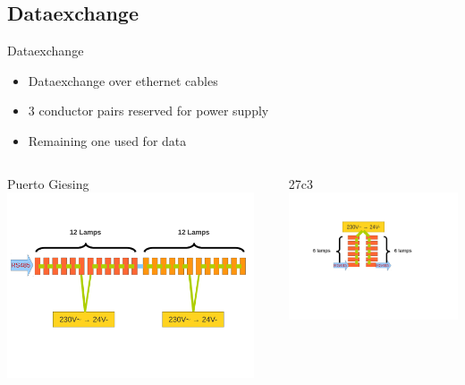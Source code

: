 \documentclass{beamer}
\begin{document}
\subsection{Dataexchange}
  \begin{frame}{Dataexchange}
    \begin{itemize}
      \item Dataexchange over ethernet cables 
      \item 3 conductor pairs reserved for power supply 
      \item Remaining one used for data
    \end{itemize}
    \begin{columns}[T]
      \begin{column}{7cm}
        \hskip 2.6cm
        Puerto Giesing
        \vskip 0.2cm
        \includegraphics[width=7.3cm, clip, trim= 0cm 4.6cm 0.5cm 4cm]{bilder/12lampen_rs485.pdf}
      \end{column}
      \begin{column}{5cm}
        \hskip 2.0cm
        27c3
        \vskip 0.7cm
         \includegraphics[width=5.5cm, clip, trim= 2.5cm 8cm 3.5cm 4cm]{bilder/6lampen_rs485.pdf}
      \end{column}
    \end{columns}
  \end{frame}
\end{document}
